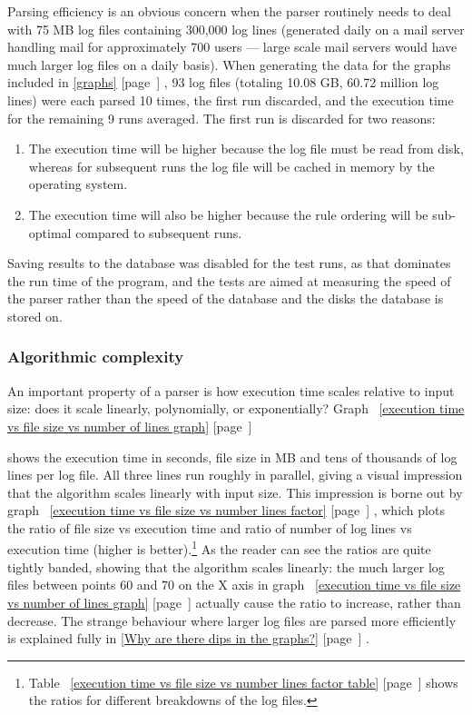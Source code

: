 \documentclass[a4paper,12pt,draft]{article}
\newcommand{\refwithpage}[1]{%
    \empty{}\ref{#1} [page~\pageref{#1}]%
}
\newcommand{\sectionref}[1]{%
    \textsection{}\refwithpage{#1}%
}
\newcommand{\numberOFlogFILES}[0]{%
    93%
}
\begin{document}
\label{rule efficiency}

Parsing efficiency is an obvious concern when the parser routinely needs to
deal with 75 MB log files containing 300,000 log lines (generated daily on
a mail server handling mail for approximately 700 users --- large scale
mail servers would have much larger log files on a daily basis).  When
generating the data for the graphs included in \sectionref{graphs},
\numberOFlogFILES{} log files (totaling 10.08 GB, 60.72 million log lines)
were each parsed 10 times, the first run discarded, and the execution time
for the remaining 9 runs averaged.  The first run is discarded for two
reasons:

\begin{enumerate}

    \item The execution time will be higher because the log file must be
        read from disk, whereas for subsequent runs the log file will be
        cached in memory by the operating system.

    \item The execution time will also be higher because the rule ordering
        will be sub-optimal compared to subsequent runs.

\end{enumerate}

Saving results to the database was disabled for the test runs, as that
dominates the run time of the program, and the tests are aimed at measuring
the speed of the parser rather than the speed of the database and the disks
the database is stored on.

\subsubsection{Algorithmic complexity}

An important property of a parser is how execution time scales relative to
input size: does it scale linearly, polynomially, or exponentially?
Graph~\refwithpage{execution time vs file size vs number of lines graph}
shows the execution time in seconds, file size in MB and tens of thousands
of log lines per log file.  All three lines run roughly in parallel, giving
a visual impression that the algorithm scales linearly with input size.
This impression is borne out by graph~\refwithpage{execution time vs file
size vs number lines factor}, which plots the ratio of file size vs
execution time and ratio of number of log lines vs execution time (higher
is better).\footnote{Table~\refwithpage{execution time vs file size vs
number lines factor table} shows the ratios for different breakdowns of the
log files.}  As the reader can see the ratios are quite tightly banded,
showing that the algorithm scales linearly: the much larger log files
between points 60 and 70 on the X axis in graph~\refwithpage{execution time
vs file size vs number of lines graph} actually cause the ratio to
increase, rather than decrease.  The strange behaviour where larger log
files are parsed more efficiently is explained fully in \sectionref{Why are
there dips in the graphs?}.  
\end{document}
